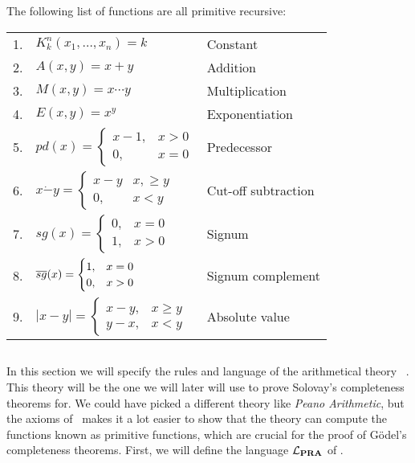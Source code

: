 \documentclass[../main.tex]{subfiles}
\begin{document}
\begin{prop}
	The following list of functions are all primitive recursive:
\begin{table}[!ht]
\begin{tabular}{p{1cm}p{6cm}p{5cm}}
	1.& $K^n_k(x_1,\ldots,x_n)=k$  & Constant  \\
	2.& $A(x,y)=x+y$ &Addition  \\
	3.&$M(x,y)=x\cdots y$  &Multiplication  \\
	4.&$E(x,y)=x^y$  &Exponentiation  \\
	5.&$pd(x)=\begin{cases}
		x-1, &x>0\\
		0,& x=0
	\end{cases}$&  Predecessor\\
		6.&$x\dot - y=\begin{cases}
			x-y&x,\geq y\\
			0,& x<y
		\end{cases}$  &Cut-off subtraction  \\
			7.&$sg(x)=\begin{cases}
				0,&x=0\\
				1,&x>0
			\end{cases}$& Signum \\
				8.& $\overline{sg}(x)=\begin{cases}
				1,&x=0\\
				0,&x>0
			\end{cases}$& Signum complement  \\
				9.& $|x-y|=\begin{cases}
				x-y,&x\geq y\\
				y-x,& x<y
			\end{cases}$& Absolute value  \\
\end{tabular}
\end{table}
\end{prop}

\subsection{\PRA}
In this section we will specify the rules and language of the arithmetical
theory \PRA\ . This theory will be the one we will later will use to prove
Solovay's completeness theorems for. We could have picked a different theory
like \textit{Peano Arithmetic}, but the axioms of \PRA\ makes it a lot easier
to show that the theory can compute the functions known as primitive functions,
which are crucial for the proof of Gödel's completeness theorems. First, we
will define the language $\mathcal{L}_{\text{\textbf{PRA}}}$ of \PRA.
\end{document}
